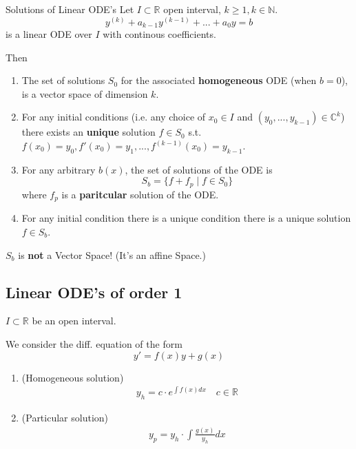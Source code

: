 \documentclass[a4paper,fontsize = 10pt]{article}
\def\R{\mathbb{R}}
\def\C{\mathbb{C}}
\def\N{\mathbb{N}}
\begin{document}
\begin{mainbox}{Solutions of Linear ODE's}
    Let $I \subset \R$ open interval, $k \geq 1, k \in \N$.
    $$y^{(k)}+a_{k-1}y^{(k-1)} + ... + a_0y = b$$
    is a linear ODE over $I$ with continous coefficients.
    
    Then
    \begin{enumerate}
        \item The set of solutions $S_0$ for the associated \textbf{homogeneous} ODE (when $b = 0$), is a vector space of dimension $k$.
        \item For any initial conditions (i.e. any choice of $x_0 \in I$ and $(y_0, ..., y_{k-1}) \in \C^k$) there exists an \textbf{unique} solution $f \in S_0$ s.t. $f(x_0) = y_0, f'(x_0) = y_1, ..., f^{(k-1)}(x_0) = y_{k-1}$.
        \item For any arbitrary $b(x)$, the set of solutions of the ODE is $$S_b = \{f + f_p \mid f \in S_0\}$$ where $f_p$ is a \textbf{paritcular} solution of the ODE.
        \item For any initial condition there is a unique condition there is a unique solution $f \in S_b$.
    \end{enumerate}
     $S_b$ is \textbf{not} a Vector Space! (It's an affine Space.)
\end{mainbox}

\subsection{Linear ODE's of order 1}
$I \subset \R$ be an open interval.

We consider the diff. equation of the form \[y' = f(x)y + g(x)\]
\begin{enumerate}
  \item (Homogeneous solution) 
  \begin{align*}
    y_h = c \cdot e^{\int f(x) dx} \quad c \in \mathbb{R}
  \end{align*}
  \item (Particular solution) 
  \begin{align*}
    y_p = y_h \cdot \int \frac{g(x)}{y_h} dx
  \end{align*}
\end{enumerate}
\end{document}
